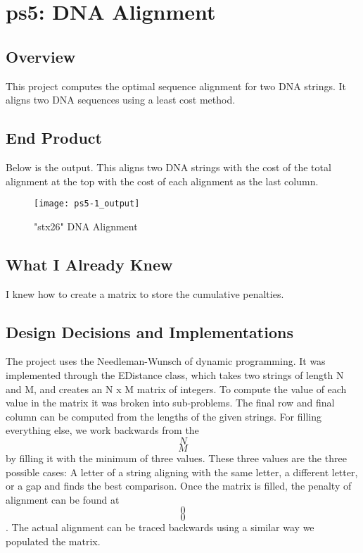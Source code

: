 \section{ps5: DNA Alignment}\label{sec:ps5}

\subsection{Overview}\label{sec:ps5:overview} %

This project computes the optimal sequence alignment for two DNA strings.
It aligns two DNA sequences using a least cost method.

\subsection{End Product}\label{sec:ps5:accomplish} %

Below is the output.
This aligns two DNA strings with the cost of the total alignment at the top with the cost of each alignment as the last column.

\begin{figure}[h]
\centering
\begin{minipage}[b]{0.4\textwidth}
\texttt{[image: ps5-1\_output]}
\caption{"stx26" DNA Alignment}
\end{minipage}
\end{figure}

\subsection{What I Already Knew}\label{sec:ps5:knew} %

I knew how to create a matrix to store the cumulative penalties.

\subsection{Design Decisions and Implementations}\label{sec:ps5:decisions} %

The project uses the Needleman-Wunsch of dynamic programming. 
It was implemented through the EDistance class, which takes two strings of length N and M, and creates an N x M matrix of integers.
To compute the value of each value in the matrix it was broken into sub-problems.
The final row and final column can be computed from the lengths of the given strings.
For filling everything else, we work backwards from the \[N\]\[M\] by filling it with the minimum of three values. 
These three values are the three possible cases: A letter of a string aligning with the same letter, a different letter, or a gap and finds the best comparison.
Once the matrix is filled, the penalty of alignment can be found at \[0\]\[0\].
The actual alignment can be traced backwards using a similar way we populated the matrix.

